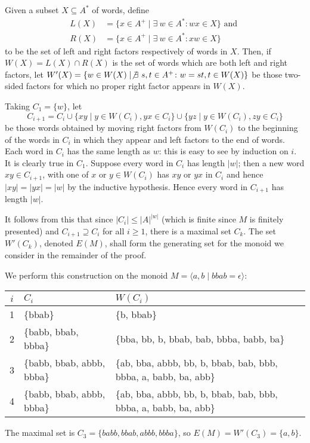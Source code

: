 \documentclass[nosubthm]{lmaths}
\begin{document}
Given a subset $X \subseteq A^*$ of words, define
	\begin{align*}
		L(X) &= \{ x \in A^+ \mid \exists\ w \in A^* \colon wx \in X \} \text{ and } \\
		R(X) &= \{ x \in A^+ \mid \exists\ w \in A^* \colon xw \in X \}
	\end{align*}
to be the set of left and right factors respectively of words in $X$. Then, if $W(X) = L(X) \cap R(X)$ is the set of words which are both left and right factors, let $W'(X) = \{ w \in W(X) \mid \not\exists\ s, t \in A^+ \colon w = st, t \in W(X) \}$ be those two-sided factors for which no proper right factor appears in $W(X)$.

Taking $C_1 = \{w\}$, let
	\[ C_{i+1} = C_i \cup \{ xy \mid y \in W(C_i), yx \in C_i \} \cup \{ yz \mid y \in W(C_i), zy \in C_i \} \]
be those words obtained by moving right factors from $W(C_i)$ to the beginning of the words in $C_i$ in which they appear and left factors to the end of words. Each word in $C_i$ has the same length as $w$: this is easy to see by induction on $i$. It is clearly true in $C_1$. Suppose every word in $C_i$ has length $|w|$; then a new word $xy \in C_{i+1}$, with one of $x$ or $y \in W(C_i)$ has $xy$ or $yx$ in $C_i$ and hence $|xy| = |yx| = |w|$ by the inductive hypothesis. Hence every word in $C_{i+1}$ has length $|w|$.

It follows from this that since $|C_i| \le |A|^{|w|}$ (which is finite since $M$ is finitely presented) and $C_{i+1} \supseteq C_i$ for all $i \ge 1$, there is a maximal set $C_k$. The set $W'(C_k)$, denoted $E(M)$, shall form the generating set for the monoid we consider in the remainder of the proof.

\begin{example}
	We perform this construction on the monoid $M = \langle a, b \mid bbab = \epsilon \rangle$:

	\begin{center}
	\begin{tabular}{c|ll}
		$i$ & $C_i$ & $W(C_i)$ \\
		\hline
		1 & \{bbab\} & \{b, bbab\} \\
		2 & \{babb, bbab, bbba\} & \{bba, bb, b, bbab, bab, bbba, babb, ba\} \\
		3 & \{babb, bbab, abbb, bbba\} & \{ab, bba, abbb, bb, b, bbab, bab, bbb, bbba, a, babb, ba, abb\} \\
		4 & \{babb, bbab, abbb, bbba\} & \{ab, bba, abbb, bb, b, bbab, bab, bbb, bbba, a, babb, ba, abb\}
	\end{tabular}
	\end{center}

	The maximal set is $C_3 = \{babb, bbab, abbb, bbba\}$, so $E(M) = W'(C_3) = \{a, b\}$.
\end{example}
\end{document}
